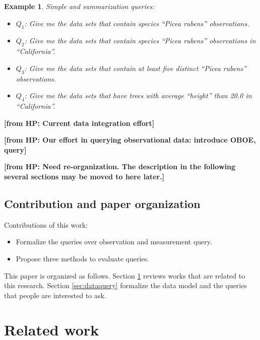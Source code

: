 \documentclass[conference]{IEEEtran}
\newtheorem{example}{Example}[section]
\newcommand{\from}[2]{{\bf[{\sc from #1:} #2]}}
\begin{document}
\begin{example}\label{eg:query}
Simple and summarization queries: 
\begin{itemize}
\item $Q_1$: Give me the data sets that contain species ``Picea rubens'' observations.
\item $Q_2$: Give me the data sets that contain species ``Picea rubens''
  observations in ``California''. 
\item $Q_3$: Give me the data sets that contain at least five distinct
  ``Picea rubens'' observations.
\item $Q_4$: Give me the data sets that have trees with average ``height''
  than 20.0 in ``California''. 
\end{itemize}
\end{example}


\from{HP}{Current data integration effort}

\from{HP}{Our effort in querying observational data: introduce OBOE, query}

\from{HP}{Need re-organization. The description in the
  following several sections may be moved to here later.}

\subsection{Contribution and paper organization}
Contributions of this work:
\begin{itemize}
\item Formalize the queries over observation and measurement query.
\item Propose three methods to evaluate queries. 
\end{itemize}

This paper is organized as follows. 
Section \ref{sec:relatedwork} reviews works that are related to this
research. Section \ref{sec:dataquery} formalize the data model and the
queries that people are interested to ask. 

\section{Related work}\label{sec:relatedwork}
\end{document}
